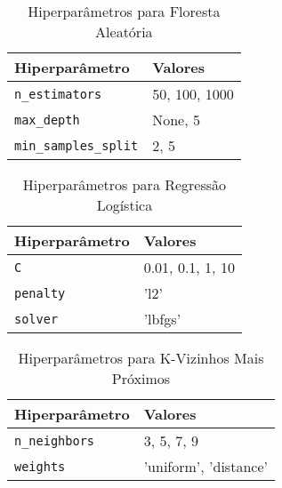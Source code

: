 \begin{table}[h]
\centering
\caption{Hiperparâmetros para Floresta Aleatória}
\label{tab:rf_hyperparams}
\begin{tabular}{ll}
\hline
\textbf{Hiperparâmetro} & \textbf{Valores} \\
\hline
\texttt{n\_estimators} & 50, 100, 1000 \\
\texttt{max\_depth} & None, 5 \\
\texttt{min\_samples\_split} & 2, 5 \\
\hline
\end{tabular}

\end{table}

\begin{table}[h]
\centering
\caption{Hiperparâmetros para Regressão Logística}
\label{tab:lr_hyperparams}

\begin{tabular}{ll}
\hline
\textbf{Hiperparâmetro} & \textbf{Valores} \\
\hline
\texttt{C} & 0.01, 0.1, 1, 10 \\
\texttt{penalty} & 'l2' \\
\texttt{solver} & 'lbfgs' \\
\hline
\end{tabular}

\end{table}

\begin{table}[h]
\centering
\caption{Hiperparâmetros para K-Vizinhos Mais Próximos}
\label{tab:knn_hyperparams}

\begin{tabular}{ll}
\hline
\textbf{Hiperparâmetro} & \textbf{Valores} \\
\hline
\texttt{n\_neighbors} & 3, 5, 7, 9 \\
\texttt{weights} & 'uniform', 'distance' \\
\hline
\end{tabular}

\end{table}

